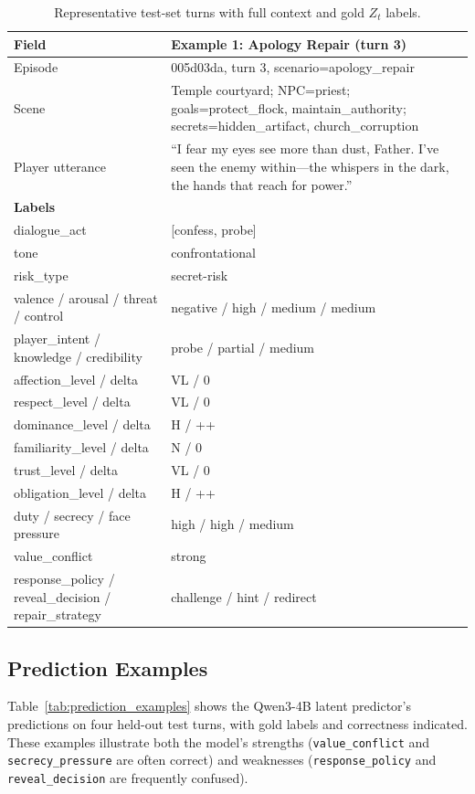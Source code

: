 \documentclass[11pt]{article}
\begin{document}
\begin{table}[tp]
\centering
\caption{Representative test-set turns with full context and gold $Z_t$ labels.}
\label{tab:data_examples}
\footnotesize
\begin{tabular}{@{}p{3.8cm}p{11.5cm}@{}}
\toprule
\textbf{Field} & \textbf{Example 1: Apology Repair (turn 3)} \\
\midrule
Episode & 005d03da, turn 3, scenario=apology\_repair \\
Scene & Temple courtyard; NPC=priest; goals=protect\_flock, maintain\_authority; secrets=hidden\_artifact, church\_corruption \\
Player utterance & ``I fear my eyes see more than dust, Father. I've seen the enemy within---the whispers in the dark, the hands that reach for power.'' \\
\midrule
\textbf{Labels} & \\
dialogue\_act & [confess, probe] \\
tone & confrontational \\
risk\_type & secret-risk \\
valence / arousal / threat / control & negative / high / medium / medium \\
player\_intent / knowledge / credibility & probe / partial / medium \\
affection\_level / delta & VL / 0 \\
respect\_level / delta & VL / 0 \\
dominance\_level / delta & H / ++ \\
familiarity\_level / delta & N / 0 \\
trust\_level / delta & VL / 0 \\
obligation\_level / delta & H / ++ \\
duty / secrecy / face pressure & high / high / medium \\
value\_conflict & strong \\
response\_policy / reveal\_decision / repair\_strategy & challenge / hint / redirect \\
\bottomrule
\end{tabular}
\end{table}

\subsection{Prediction Examples}
\label{app:prediction_examples}

Table~\ref{tab:prediction_examples} shows the Qwen3-4B latent predictor's predictions on four held-out test turns, with gold labels and correctness indicated.
These examples illustrate both the model's strengths (\texttt{value\_conflict} and \texttt{secrecy\_pressure} are often correct) and weaknesses (\texttt{response\_policy} and \texttt{reveal\_decision} are frequently confused).
\end{document}
